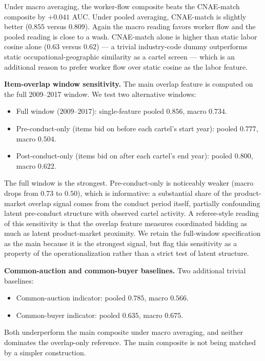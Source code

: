 Under macro averaging, the worker-flow composite beats the CNAE-match composite by $+0.041$ AUC. Under pooled averaging, CNAE-match is slightly better ($0.855$ versus $0.809$). Again the macro reading favors worker flow and the pooled reading is close to a wash. CNAE-match alone is higher than static labor cosine alone ($0.63$ versus $0.62$) --- a trivial industry-code dummy outperforms static occupational-geographic similarity as a cartel screen --- which is an additional reason to prefer worker flow over static cosine as the labor feature.

\textbf{Item-overlap window sensitivity.} The main overlap feature is computed on the full 2009--2017 window. We test two alternative windows:

\begin{itemize}
\item Full window ($2009$--$2017$): single-feature pooled $0.856$, macro $0.734$.
\item Pre-conduct-only (items bid on before each cartel's start year): pooled $0.777$, macro $0.504$.
\item Post-conduct-only (items bid on after each cartel's end year): pooled $0.800$, macro $0.622$.
\end{itemize}

The full window is the strongest. Pre-conduct-only is noticeably weaker (macro drops from $0.73$ to $0.50$), which is informative: a substantial share of the product-market overlap signal comes from the conduct period itself, partially confounding latent pre-conduct structure with observed cartel activity. A referee-style reading of this sensitivity is that the overlap feature measures coordinated bidding as much as latent product-market proximity. We retain the full-window specification as the main because it is the strongest signal, but flag this sensitivity as a property of the operationalization rather than a strict test of latent structure.

\textbf{Common-auction and common-buyer baselines.} Two additional trivial baselines:

\begin{itemize}
\item Common-auction indicator: pooled $0.785$, macro $0.566$.
\item Common-buyer indicator: pooled $0.635$, macro $0.675$.
\end{itemize}

Both underperform the main composite under macro averaging, and neither dominates the overlap-only reference. The main composite is not being matched by a simpler construction.

